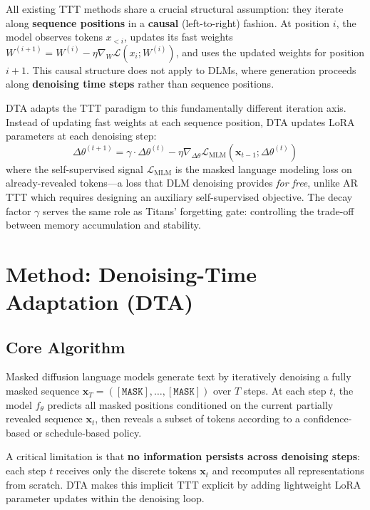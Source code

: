 \documentclass{article}
\begin{document}
All existing TTT methods share a crucial structural assumption: they iterate along \textbf{sequence positions} in a \textbf{causal} (left-to-right) fashion. At position $i$, the model observes tokens $x_{<i}$, updates its fast weights $W^{(i+1)} = W^{(i)} - \eta \nabla_W \mathcal{L}(x_i; W^{(i)})$, and uses the updated weights for position $i{+}1$. This causal structure does not apply to DLMs, where generation proceeds along \textbf{denoising time steps} rather than sequence positions.

DTA adapts the TTT paradigm to this fundamentally different iteration axis. Instead of updating fast weights at each sequence position, DTA updates LoRA parameters at each denoising step:
\begin{equation}
\Delta\theta^{(t+1)} = \gamma \cdot \Delta\theta^{(t)} - \eta \nabla_{\Delta\theta} \mathcal{L}_{\mathrm{MLM}}(\mathbf{x}_{t-1}; \Delta\theta^{(t)})
\label{eq:dta_update}
\end{equation}
where the self-supervised signal $\mathcal{L}_{\mathrm{MLM}}$ is the masked language modeling loss on already-revealed tokens---a loss that DLM denoising provides \emph{for free}, unlike AR TTT which requires designing an auxiliary self-supervised objective. The decay factor $\gamma$ serves the same role as Titans' forgetting gate: controlling the trade-off between memory accumulation and stability.

\section{Method: Denoising-Time Adaptation (DTA)}
\label{sec:method}

\subsection{Core Algorithm}
\label{sec:core_algo}

Masked diffusion language models generate text by iteratively denoising a fully masked sequence $\mathbf{x}_T = ([\texttt{MASK}], \ldots, [\texttt{MASK}])$ over $T$ steps. At each step $t$, the model $f_\theta$ predicts all masked positions conditioned on the current partially revealed sequence $\mathbf{x}_t$, then reveals a subset of tokens according to a confidence-based or schedule-based policy.

A critical limitation is that \textbf{no information persists across denoising steps}: each step $t$ receives only the discrete tokens $\mathbf{x}_t$ and recomputes all representations from scratch. DTA makes this implicit TTT explicit by adding lightweight LoRA parameter updates within the denoising loop.
\end{document}
